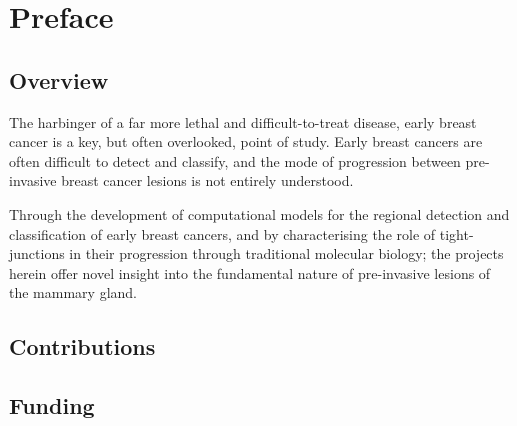 \newpage
\section*{Preface}


\subsection*{Overview}
The harbinger of a far more lethal and difficult-to-treat disease, early breast cancer is a key, but often overlooked, point of study. Early breast cancers are often difficult to detect and classify, and the mode of progression between pre-invasive breast cancer lesions is not entirely understood.\par

Through the development of computational models for the regional detection and classification of early breast cancers, and by characterising the role of tight-junctions in their progression through traditional molecular biology; the projects herein offer novel insight into the fundamental nature of pre-invasive lesions of the mammary gland.\par
 
\subsection*{Contributions}
\subsection*{Funding}
